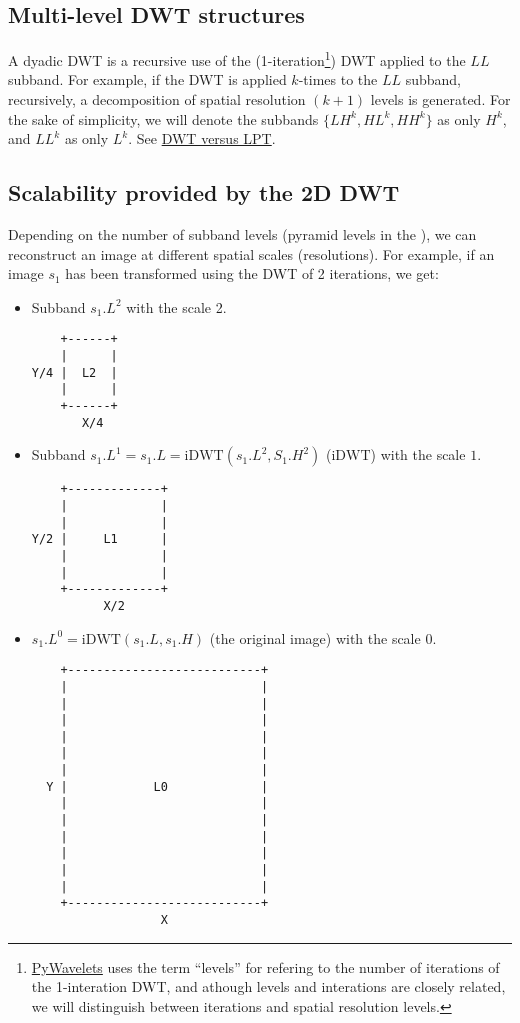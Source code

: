 \subsection{Multi-level DWT structures}
A dyadic DWT is a recursive use of the
(1-iteration\footnote{\href{https://pywavelets.readthedocs.io/en/latest/index.html}{PyWavelets}
  uses the term ``levels'' for refering to the number of iterations of
  the 1-interation DWT, and athough levels and interations are closely
  related, we will distinguish between iterations and spatial
  resolution levels.}) DWT applied to the $LL$ subband. For example,
if the DWT is applied $k$-times to the $LL$ subband, recursively, a
decomposition of spatial resolution $(k+1)$ levels is generated. For
the sake of simplicity, we will denote the subbands $\{LH^k, HL^k,
HH^k\}$ as only $H^k$, and $LL^k$ as only $L^k$. See
\href{https://nbviewer.jupyter.org/github/Sistemas-Multimedia/MCDWT/blob/master/docs/DWT_vs_LPT.ipynb}{DWT
  versus LPT}.

\subsection{Scalability provided by the 2D DWT}
Depending on the number of subband levels (pyramid levels in the
), we can
reconstruct an image at different spatial scales (resolutions). For
example, if an image $s_1$ has been transformed using the DWT of 2
iterations, we get:
\begin{itemize}
\item Subband $s_1.L^2$ with the scale 2.
\begin{verbatim}
    +------+
    |      |
Y/4 |  L2  |
    |      |
    +------+
       X/4
\end{verbatim}
\item Subband $s_1.L^1=s_1.L=\text{iDWT}(s_1.L^2, S_1.H^2)$
  ($\text{iDWT}$) with the scale $1$.
\begin{verbatim}
    +-------------+
    |             |
    |             |
Y/2 |     L1      |
    |             | 
    |             |
    +-------------+
          X/2
\end{verbatim}
  
\item $s_1.L^0=\text{iDWT}(s_1.L, s_1.H)$ (the original image) with
  the scale $0$.
\begin{verbatim}
    +---------------------------+
    |                           |
    |                           |
    |                           | 
    |                           |
    |                           |
    |                           |
  Y |            L0             |
    |                           | 
    |                           |
    |                           | 
    |                           | 
    |                           |
    |                           |
    +---------------------------+
                  X
\end{verbatim}
\end{itemize}

